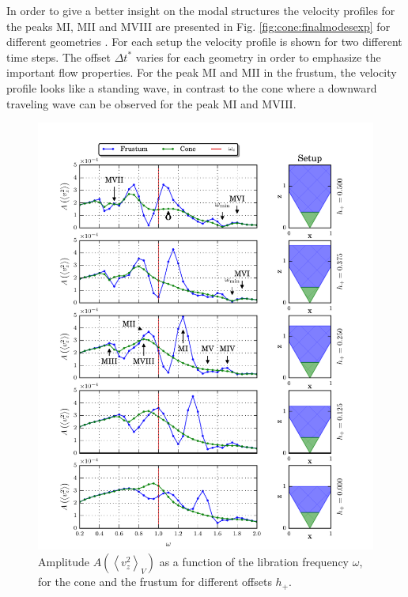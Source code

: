 In order to give a better insight on the modal structures the velocity profiles for the peaks M\RN{1}, M\RN{2} and M\RN{8}
are presented in Fig. \ref{fig:cone:finalmodesexp} for different geometries .
For each setup the velocity profile is shown for two different time steps. The offset $\Delta t^*$  varies for each geometry in order to emphasize
the important flow properties.
For the peak M\RN{1} and M\RN{2} in the frustum, the velocity profile looks like a standing wave,
in contrast to the cone where a downward traveling wave can be observed for the peak M\RN{1} and M\RN{8}.


\begin{figure}[!pt]
  \centering
  \includegraphics{gfx/cone/final/transition.pdf}
  \caption{
      \label{fig:cone:finaltransition}Amplitude $A\left(\left<v^2_z\right>_V\right)$ as a function of the libration frequency $\omega$,
      for the cone  and the frustum for different offsets $h_+$.
    }
\end{figure}
\clearpage

